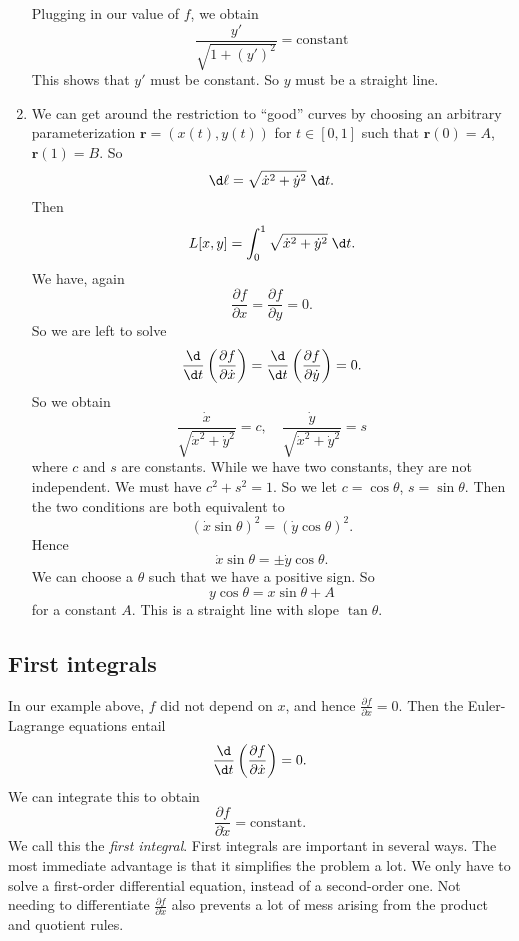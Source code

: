 \documentclass[a4paper]{article}
\begin{document}
\begin{eg}
\begin{enumerate}
      Plugging in our value of $f$, we obtain
      \[
        \frac{y'}{\sqrt{1 + (y')^2}} = \text{constant}
      \]
      This shows that $y'$ must be constant. So $y$ must be a straight line.
    \item We can get around the restriction to ``good'' curves by choosing an arbitrary parameterization $\mathbf{r} = (x(t), y(t))$ for $t\in [0, 1]$ such that $\mathbf{r}(0) = A$, $\mathbf{r}(1) = B$. So
      \[
        \d \ell = \sqrt{\dot x^2 + \dot y^2}\;\d t.
      \]
      Then
      \[
        L[x, y] = \int_0^1 \sqrt{\dot x^2 + \dot y^2} \;\d t.
      \]
      We have, again
      \[
        \frac{\partial f}{\partial x} = \frac{\partial f}{\partial y} = 0.
      \]
      So we are left to solve
      \[
        \frac{\d }{\d t}\left(\frac{\partial f}{\partial \dot x}\right) = \frac{\d }{\d t}\left(\frac{\partial f}{\partial \dot y}\right) = 0.
      \]
      So we obtain
      \[
        \frac{\dot x}{\sqrt{\dot x^2 + \dot y^2}} = c,\quad \frac{\dot y}{\sqrt{\dot x^2 + \dot y^2}} = s
      \]
      where $c$ and $s$ are constants. While we have two constants, they are not independent. We must have $c^2 + s^2 = 1$. So we let $c = \cos \theta$, $s = \sin \theta$. Then the two conditions are both equivalent to
      \[
        (\dot x \sin \theta)^2 = (\dot y\cos \theta)^2.
      \]
      Hence
      \[
        \dot x \sin \theta = \pm\dot y \cos \theta.
      \]
      We can choose a $\theta$ such that we have a positive sign. So
      \[
        y\cos \theta = x\sin \theta + A
      \]
      for a constant $A$. This is a straight line with slope $\tan \theta$.
  \end{enumerate}
\end{eg}
\subsection{First integrals}
In our example above, $f$ did not depend on $x$, and hence $\frac{\partial f}{\partial x} = 0$. Then the Euler-Lagrange equations entail
\[
  \frac{\d}{\d t}\left(\frac{\partial f}{\partial \dot{x}}\right) = 0.
\]
We can integrate this to obtain
\[
  \frac{\partial f}{\partial \dot{x}} = \text{constant}.
\]
We call this the \emph{first integral}. First integrals are important in several ways. The most immediate advantage is that it simplifies the problem a lot. We only have to solve a first-order differential equation, instead of a second-order one. Not needing to differentiate $\frac{\partial f}{\partial \dot{x}}$ also prevents a lot of mess arising from the product and quotient rules.
\end{document}
